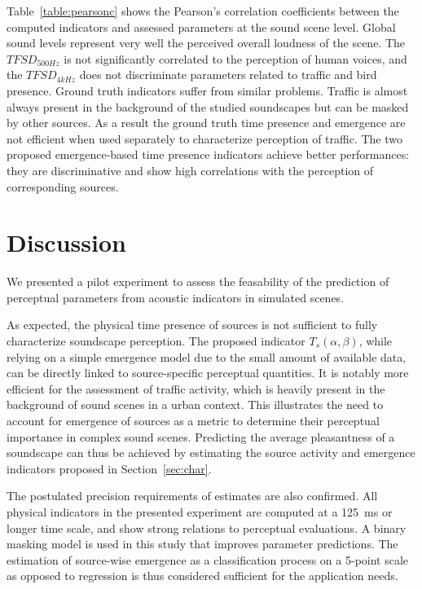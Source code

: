 \documentclass{article}
\begin{document}
\begin{sloppy}
Table~\ref{table:pearsonc} shows the Pearson's correlation coefficients between the computed indicators and assessed parameters at the sound scene level. Global sound levels represent very well the perceived overall loudness of the scene. The $TFSD_{500Hz}$ is not significantly correlated to the perception of human voices, and the $TFSD_{4kHz}$ does not discriminate parameters related to traffic and bird presence. Ground truth indicators suffer from similar problems. Traffic is almost always present in the background of the studied soundscapes but can be masked by other sources. As a result the ground truth time presence and emergence are not efficient when used separately to characterize perception of traffic. The two proposed emergence-based time presence indicators achieve better performances: they are discriminative and show high correlations with the perception of corresponding sources.


\section{Discussion}
\label{sec:disc}

We presented a pilot experiment to assess the feasability of the prediction of perceptual parameters from acoustic indicators in simulated scenes.

As expected, the physical time presence of sources is not sufficient to fully characterize soundscape perception. The proposed indicator $T_s(\alpha, \beta)$, while relying on a simple emergence model due to the small amount of available data, can be directly linked to source-specific perceptual quantities. It is notably more efficient for the assessment of traffic activity, which is heavily present in the background of sound scenes in a urban context. This illustrates the need to account for emergence of sources as a metric to determine their perceptual importance in complex sound scenes. Predicting the average pleasantness of a soundscape can thus be achieved by estimating the source activity and emergence indicators proposed in Section~\ref{sec:char}.

The postulated precision requirements of estimates are also confirmed. All physical indicators in the presented experiment are computed at a 125~ms or longer time scale, and show strong relations to perceptual evaluations. A binary masking model is used in this study that improves parameter predictions. The estimation of source-wise emergence as a classification process on a 5-point scale as opposed to regression is thus considered sufficient for the application needs.


\end{sloppy}
\end{document}

